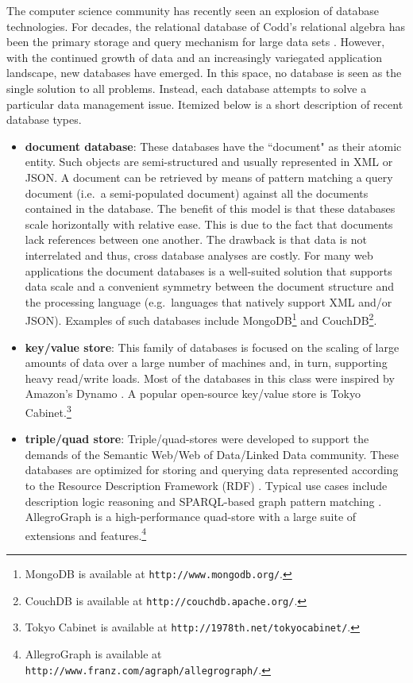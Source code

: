 \documentclass{svmult}
\newcommand{\ttt}{\texttt}
\begin{document}
The computer science community has recently seen an explosion of database technologies. For decades, the relational database of Codd's relational algebra has been the primary storage and query mechanism for large data sets \cite{rdbms:codd1970}. However, with the continued growth of data and an increasingly variegated application landscape, new databases have emerged. In this space, no database is seen as the single solution to all problems. Instead, each database attempts to solve a particular data management issue. Itemized below is a short description of recent database types.
\begin{itemize}
	\item \textbf{document database}: These databases have the ``document" as their atomic entity. Such objects are semi-structured and usually represented in XML or JSON. A document can be retrieved by means of pattern matching a query document (i.e.~a semi-populated document) against all the documents contained in the database. The benefit of this model is that these databases scale horizontally with relative ease. This is due to the fact that documents lack references between one another. The drawback is that data is not interrelated and thus, cross database analyses are costly. For many web applications the document databases is a well-suited solution that supports data scale and a convenient symmetry between the document structure and the processing language (e.g.~languages that natively support XML and/or JSON). Examples of such databases include MongoDB\footnote{MongoDB is available at \ttt{http://www.mongodb.org/}.} and CouchDB\footnote{CouchDB is available at \ttt{http://couchdb.apache.org/}.}.
	\item \textbf{key/value store}: This family of databases is focused on the scaling of large amounts of data over a large number of machines and, in turn, supporting heavy read/write loads. Most of the databases in this class were inspired by Amazon's Dynamo \cite{dynamo:decandia2007}. A popular open-source key/value store is Tokyo Cabinet.\footnote{Tokyo Cabinet is available at \ttt{http://1978th.net/tokyocabinet/}.}
	\item \textbf{triple/quad store}: Triple/quad-stores were developed to support the demands of the Semantic Web/Web of Data/Linked Data community. These databases are optimized for storing and querying data represented according to the Resource Description Framework (RDF) \cite{rdfintro:miller1998}. Typical use cases include description logic reasoning \cite{baader:dl2003} and SPARQL-based graph pattern matching \cite{sparql:prud2004}. AllegroGraph is a high-performance quad-store with a large suite of extensions and features.\footnote{AllegroGraph is available at \ttt{http://www.franz.com/agraph/allegrograph/}.}

\end{itemize}
\end{document}
